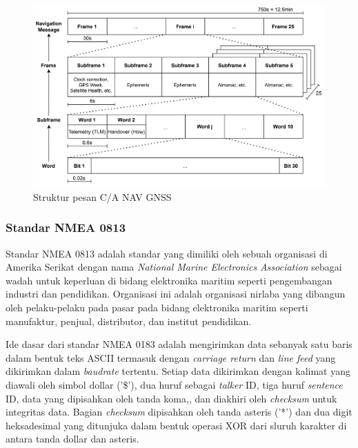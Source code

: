 \begin{figure}[ht]
	\centering
	\includegraphics[width=13cm]{contents/chapter-2/gnss_msg_structure.png}
	\caption{Struktur pesan C/A NAV GNSS}
	\label{Fig: gnss_message_structure}
\end{figure}

\subsubsection{Standar NMEA 0813}
Standar NMEA 0813 adalah standar yang dimiliki oleh sebuah organisasi di Amerika Serikat dengan nama \textit{National Marine Electronics Association} sebagai wadah untuk keperluan di bidang elektronika maritim seperti pengembangan industri dan pendidikan. Organisasi ini adalah organisasi nirlaba yang dibangun oleh pelaku-pelaku pada pasar pada bidang elektronika maritim seperti manufaktur, penjual, distributor, dan institut pendidikan.

Ide dasar dari standar NMEA 0183 adalah mengirimkan data sebanyak satu baris dalam bentuk teks ASCII termasuk dengan \textit{carriage return} dan \textit{line feed} yang dikirimkan dalam \textit{baudrate} tertentu. Setiap data dikirimkan dengan kalimat yang diawali oleh simbol dollar ('\$'), dua huruf sebagai \textit{talker} ID, tiga huruf \textit{sentence} ID, data yang dipisahkan oleh tanda koma,, dan diakhiri oleh \textit{checksum} untuk integritas data. Bagian \textit{checksum} dipisahkan oleh tanda asteris ('*') dan dua digit heksadesimal yang ditunjuka dalam bentuk operasi XOR dari sluruh karakter di antara tanda dollar dan asteris.

